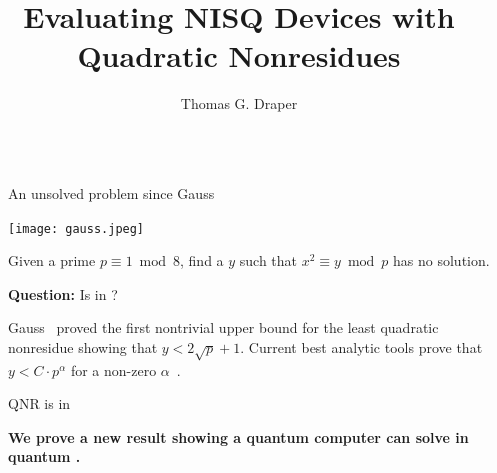 \documentclass[final]{beamer}
\title{Evaluating NISQ Devices with Quadratic Nonresidues}
\author{Thomas G. Draper}
\institute[shortinst]{Center for Communications Research at La Jolla}
\providecommand{\QNR}{\csword{QNR}}
\newlength{\sepwidth}
\newlength{\colwidth}
\newcommand{\separatorcolumn}{\begin{column}{\sepwidth}\end{column}}
\begin{document}
\begin{frame}[t]

\begin{columns}[t]
\separatorcolumn

\begin{column}{\colwidth}

  \begin{block}{An unsolved problem since Gauss}
  \begin{minipage}[c]{0.3\colwidth}
    \texttt{[image: gauss.jpeg]}
  \end{minipage}
  \begin{minipage}[l]{0.7\colwidth}
    \bigskip

    Given a prime $p\equiv 1\bmod 8$, find a $y$ such that $x^2\equiv y \bmod p$ has no solution.  

    \bigskip
  {\bf Question:} Is \QNR in \xP?
    \bigskip
  \end{minipage}

Gauss~\cite{gauss} proved the first nontrivial upper bound for the least quadratic nonresidue showing that $y<2\sqrt{p}+1$.
Current best analytic tools prove that $y < C\cdot p^\alpha$ for a non-zero $\alpha$~\cite[p. 33]{1993--cohen}.
  \end{block}

  \begin{exampleblock}{QNR is in \EQPC}

    {\bf We prove a new result showing a quantum computer can solve \QNR in quantum \xP.}


\end{exampleblock}
\end{column}
\end{columns}
\end{frame}
\end{document}
